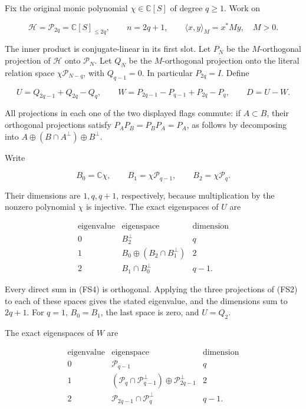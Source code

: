 Fix the original monic polynomial \(\chi\in\mathbb C[S]\) of degree \(q\ge1\). Work on

\[
\mathcal H=\mathcal P_{2q}=\mathbb C[S]_{\le2q},\qquad n=2q+1,
\qquad \langle x,y\rangle_M=x^*My,
\quad M>0.
\tag{FS1}
\]

The inner product is conjugate-linear in its first slot. Let \(P_N\) be the \(M\)-orthogonal projection of \(\mathcal H\) onto \(\mathcal P_N\). Let \(Q_N\) be the \(M\)-orthogonal projection onto the literal relation space \(\chi\mathcal P_{N-q}\), with \(Q_{q-1}=0\). In particular \(P_{2q}=I\). Define

\[
U=Q_{2q-1}+Q_{2q}-Q_q,
\qquad
W=P_{2q-1}-P_{q-1}+P_{2q}-P_q,
\qquad D=U-W.
\tag{FS2}
\]

All projections in each one of the two displayed flags commute: if \(A\subset B\), their orthogonal projections satisfy \(P_AP_B=P_BP_A=P_A\), as follows by decomposing into \(A\oplus(B\cap A^\perp)\oplus B^\perp\).

Write

\[
B_0=\mathbb C\chi,\qquad
B_1=\chi\mathcal P_{q-1},\qquad
B_2=\chi\mathcal P_q.
\tag{FS3}
\]

Their dimensions are \(1,q,q+1\), respectively, because multiplication by the nonzero polynomial \(\chi\) is injective. The exact eigenspaces of \(U\) are

\[
\begin{array}{c|c|c}
\text{eigenvalue}&\text{eigenspace}&\text{dimension}\\\hline
0&B_2^\perp&q\\
1&B_0\oplus(B_2\cap B_1^\perp)&2\\
2&B_1\cap B_0^\perp&q-1.
\end{array}
\tag{FS4}
\]

Every direct sum in (FS4) is orthogonal. Applying the three projections of (FS2) to each of these spaces gives the stated eigenvalue, and the dimensions sum to \(2q+1\). For \(q=1\), \(B_0=B_1\), the last space is zero, and \(U=Q_2\).

The exact eigenspaces of \(W\) are

\[
\begin{array}{c|c|c}
\text{eigenvalue}&\text{eigenspace}&\text{dimension}\\\hline
0&\mathcal P_{q-1}&q\\
1&(\mathcal P_q\cap\mathcal P_{q-1}^\perp)\oplus\mathcal P_{2q-1}^\perp&2\\
2&\mathcal P_{2q-1}\cap\mathcal P_q^\perp&q-1.
\end{array}
\tag{FS5}
\]

